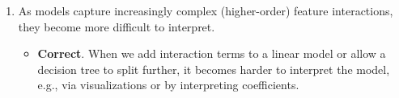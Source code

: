 \begin{enumerate}
		\item As models capture increasingly complex (higher-order) feature interactions, they become more difficult to interpret.
        \begin{itemize}
      		\item[$\Rightarrow$] \textbf{Correct}. When we add interaction terms to a linear model or allow a decision tree to split further, it becomes harder to interpret the model, e.g., via visualizations or by interpreting coefficients. 
     	\end{itemize}
        
    \end{enumerate}

